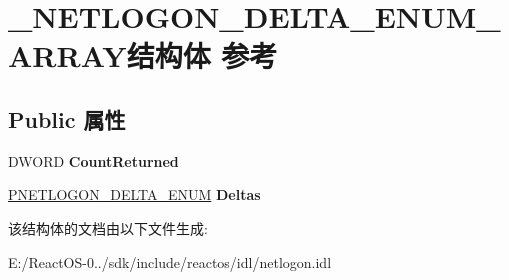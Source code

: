 \hypertarget{struct___n_e_t_l_o_g_o_n___d_e_l_t_a___e_n_u_m___a_r_r_a_y}{}\section{\+\_\+\+N\+E\+T\+L\+O\+G\+O\+N\+\_\+\+D\+E\+L\+T\+A\+\_\+\+E\+N\+U\+M\+\_\+\+A\+R\+R\+A\+Y结构体 参考}
\label{struct___n_e_t_l_o_g_o_n___d_e_l_t_a___e_n_u_m___a_r_r_a_y}
\subsection*{Public 属性}
\begin{DoxyCompactItemize}
\item 
\mbox{\label{struct___n_e_t_l_o_g_o_n___d_e_l_t_a___e_n_u_m___a_r_r_a_y_adbb299b485059614ed63280e5af832d7}} 
D\+W\+O\+RD {\bfseries Count\+Returned}
\item 
\mbox{\label{struct___n_e_t_l_o_g_o_n___d_e_l_t_a___e_n_u_m___a_r_r_a_y_a5fdc90c2a0ee3a53f37ed9c45bd2266d}} 
\hyperlink{struct___n_e_t_l_o_g_o_n___d_e_l_t_a___e_n_u_m}{P\+N\+E\+T\+L\+O\+G\+O\+N\+\_\+\+D\+E\+L\+T\+A\+\_\+\+E\+N\+UM} {\bfseries Deltas}
\end{DoxyCompactItemize}


该结构体的文档由以下文件生成\+:\begin{DoxyCompactItemize}
\item 
E\+:/\+React\+O\+S-\/0../sdk/include/reactos/idl/netlogon.\+idl\end{DoxyCompactItemize}
